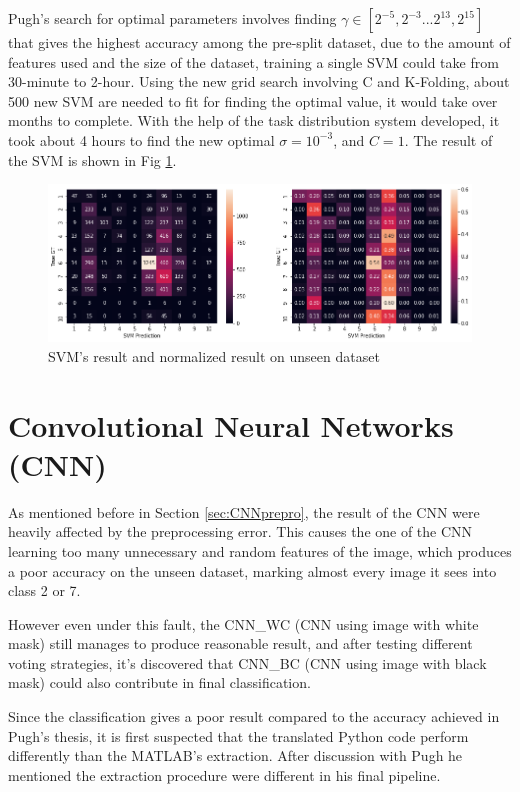\documentclass[bsc,logo,twoside,fullspacing,parskip]{infthesis}
\begin{document}
Pugh's search for optimal parameters involves finding \(\gamma\in[2^{-5},2^{-3}...2^{13},2^{15}]\) that gives the highest accuracy among the pre-split dataset, due to the amount of features used and the size of the dataset, training a single SVM could take from 30-minute to 2-hour. Using the new grid search involving C and K-Folding, about 500 new SVM are needed to fit for finding the optimal value, it would take over months to complete.
With the help of the task distribution system developed, it took about 4 hours to find the
new optimal \(\sigma = 10^{-3}\), and \(C = 1\).
The result of the SVM is shown in Fig \ref{fig:svmacc}.

\begin{figure}[h]
\centering
    \includegraphics[scale=0.44]{graph/svmresult.png}
    \caption{SVM's result and normalized result on unseen dataset}
    \label{fig:svmacc}
\end{figure} 

\section{Convolutional Neural Networks (CNN)}
\label{sec:cnn}

As mentioned before in Section \ref{sec:CNNprepro}, the result of the CNN were heavily affected by the preprocessing error. This causes the one of the CNN learning too many unnecessary and random features of the image, which produces a poor accuracy on the unseen dataset, marking almost every image it sees into class 2 or 7. 

However even under this fault, the CNN\_WC (CNN using image with white mask) still manages to produce reasonable result, and after testing different voting strategies, it's discovered that CNN\_BC (CNN using image with black mask) could also contribute in final classification.

Since the classification gives a poor result compared to the accuracy achieved in Pugh's thesis\cite{P1}, it is first suspected that the translated Python code perform differently than the MATLAB's extraction.
After discussion with Pugh he mentioned the extraction procedure were different in his final pipeline.
\end{document}
